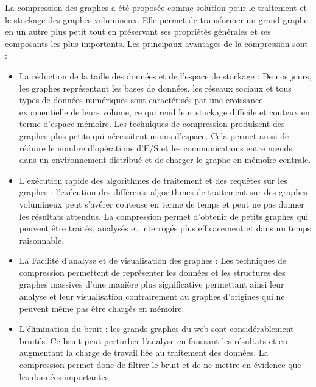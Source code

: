 La compression des graphes a été proposée comme solution pour le traitement et le stockage des graphes volumineux. Elle permet de transformer un grand graphe en un autre plus petit tout en préservant ses propriétés générales et ses composants les plus importants.
Les principaux avantages de la compression sont  \citep{liu2018graph} :
\begin{itemize}

\item La réduction de la taille des données et de l'espace de stockage : De nos jours, les graphes représentant les bases de données, les réseaux sociaux et tous types de données numériques sont caractérisés par une croissance exponentielle de leurs volume, ce qui rend leur stockage difficile et couteux en terme d'espace mémoire. Les techniques de compression produisent des graphes plus petits qui nécessitent moins d'espace. Cela permet aussi de réduire le nombre d'opérations d'E/S et les communications entre nœuds dans un environnement distribué et de charger le graphe en mémoire centrale.   

\item L'exécution rapide des algorithmes de traitement et des requêtes sur les graphes : l'exécution des différents algorithmes de traitement sur des graphes volumineux peut s'avérer couteuse en terme de temps et peut ne pas donner les résultats attendus. La compression permet d'obtenir de petits graphes qui peuvent être traités, analysés et interrogés plus efficacement et dans un temps raisonnable. 
  
\item La Facilité d'analyse et de visualisation des graphes : Les techniques de compression permettent de représenter les données et les structures des graphes massives d'une manière plus significative permettant ainsi leur analyse et leur visualisation contrairement au graphes d'origines qui ne peuvent même pas être chargés en mémoire.  

\item L'élimination du bruit : les grands graphes du web sont considérablement bruités. Ce bruit peut perturber l'analyse en faussant les résultats et en augmentant la charge de travail liée au traitement des données. La compression permet donc de filtrer le bruit et de ne mettre en évidence que les données importantes.

\end{itemize}


